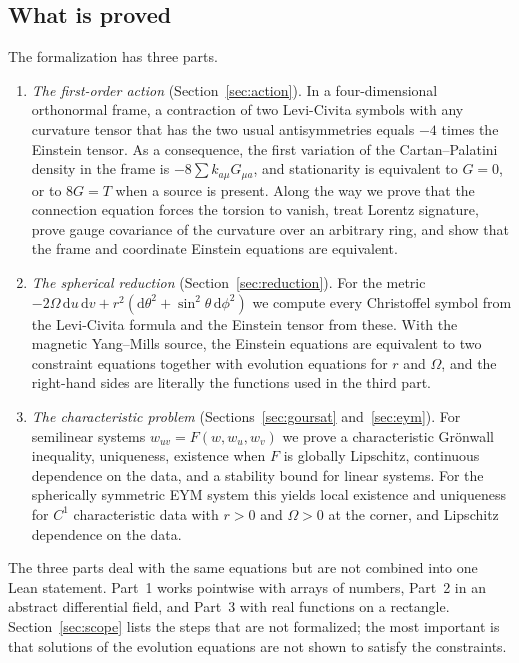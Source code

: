\documentclass{lmcs}
\newcommand{\dd}{\mathrm{d}}
\begin{document}
\subsection{What is proved}\label{subsec:contrib}

The formalization has three parts.
\begin{enumerate}
\item \emph{The first-order action} (Section~\ref{sec:action}). In a four-dimensional orthonormal frame, a contraction of two Levi-Civita symbols with any curvature tensor that has the two usual antisymmetries equals $-4$ times the Einstein tensor. As a consequence, the first variation of the Cartan--Palatini density in the frame is $-8\sum k_{a\mu}G_{\mu a}$, and stationarity is equivalent to $G=0$, or to $8G=T$ when a source is present. Along the way we prove that the connection equation forces the torsion to vanish, treat Lorentz signature, prove gauge covariance of the curvature over an arbitrary ring, and show that the frame and coordinate Einstein equations are equivalent.
\item \emph{The spherical reduction} (Section~\ref{sec:reduction}). For the metric $-2\Omega\,\dd u\,\dd v+r^2(\dd\theta^2+\sin^2\theta\,\dd\phi^2)$ we compute every Christoffel symbol from the Levi-Civita formula and the Einstein tensor from these. With the magnetic Yang--Mills source, the Einstein equations are equivalent to two constraint equations together with evolution equations for $r$ and $\Omega$, and the right-hand sides are literally the functions used in the third part.
\item \emph{The characteristic problem} (Sections~\ref{sec:goursat} and~\ref{sec:eym}). For semilinear systems $w_{uv}=F(w,w_u,w_v)$ we prove a characteristic Gr\"onwall inequality, uniqueness, existence when $F$ is globally Lipschitz, continuous dependence on the data, and a stability bound for linear systems. For the spherically symmetric EYM system this yields local existence and uniqueness for $C^1$ characteristic data with $r>0$ and $\Omega>0$ at the corner, and Lipschitz dependence on the data.
\end{enumerate}
The three parts deal with the same equations but are not combined into one Lean statement. Part~1 works pointwise with arrays of numbers, Part~2 in an abstract differential field, and Part~3 with real functions on a rectangle. Section~\ref{sec:scope} lists the steps that are not formalized; the most important is that solutions of the evolution equations are not shown to satisfy the constraints.
\end{document}
